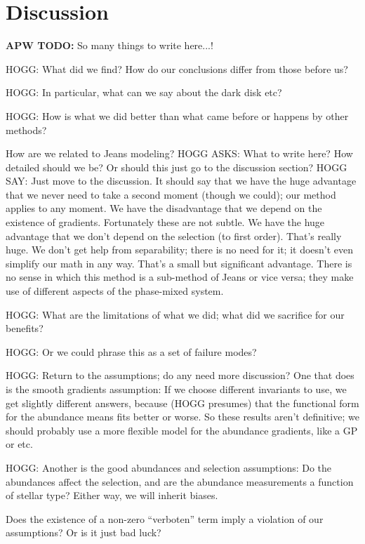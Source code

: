 \documentclass[modern]{aastex63}
\newcommand{\APWTODO}[1]{{\color{tabpurple}\textbf{APW TODO:} #1}}
\begin{document}
\section{Discussion}
\label{sec:discussion}

\APWTODO{So many things to write here...!}

HOGG: What did we find? How do our conclusions differ from those before us?

HOGG: In particular, what can we say about the dark disk etc?

HOGG: How is what we did better than what came before or happens by other methods?

How are we related to Jeans modeling?
HOGG ASKS: What to write here? How detailed should we be? Or should this just
go to the discussion section? HOGG SAY: Just move to the discussion. It should say that
we have the huge advantage that we never need to take a second moment (though we could);
our method applies to any moment. We have the disadvantage that we depend on the
existence of gradients. Fortunately these are not subtle. We have the huge advantage
that we don't depend on the selection (to first order). That's really huge. We don't
get help from separability; there is no need for it; it doesn't even simplify our
math in any way. That's a small but significant advantage. There is
no sense in which this method is a sub-method of Jeans or vice versa; they make use of
different aspects of the phase-mixed system.

HOGG: What are the limitations of what we did; what did we sacrifice for our benefits?

HOGG: Or we could phrase this as a set of failure modes?

HOGG: Return to the assumptions; do any need more discussion? One that does is the smooth
gradients assumption: If we choose different invariants to use, we get slightly different
answers, because (HOGG presumes) that the functional form for the abundance means fits
better or worse. So these results aren't definitive; we should probably use a more flexible
model for the abundance gradients, like a GP or etc.

HOGG: Another is the good abundances and selection assumptions: Do the abundances affect
the selection, and are the abundance measurements a function of stellar type? Either way,
we will inherit biases.

Does the existence of a non-zero ``verboten'' term imply a violation of our
assumptions?
Or is it just bad luck?
\end{document}
